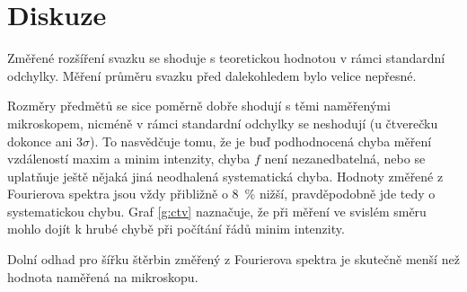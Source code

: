\section*{Diskuze}
Změřené rozšíření svazku se shoduje s teoretickou hodnotou v rámci standardní odchylky. Měření průměru svazku před dalekohledem bylo velice nepřesné.

Rozměry předmětů se sice poměrně dobře shodují s těmi naměřenými mikroskopem, nicméně v rámci standardní odchylky se neshodují (u čtverečku dokonce ani $3\sigma$). To nasvědčuje tomu, že je buď podhodnocená chyba měření vzdáleností maxim a minim intenzity, chyba $f$ není nezanedbatelná, nebo se uplatňuje ještě nějaká jiná neodhalená systematická chyba. Hodnoty změřené z Fourierova spektra jsou vždy přibližně o \SI{8}{\percent} nižší, pravděpodobně jde tedy o systematickou chybu.
Graf \ref{g:ctv} naznačuje, že při měření ve svislém směru mohlo dojít k hrubé chybě při počítání řádů minim intenzity.

Dolní odhad pro šířku štěrbin změřený z Fourierova spektra je skutečně menší než hodnota naměřená na mikroskopu.